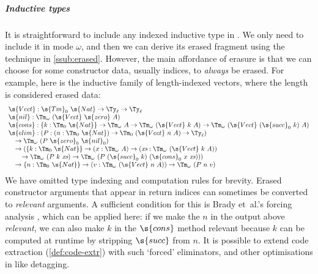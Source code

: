 \documentclass[a4paper,UKenglish,cleveref,autoref,thm-restate]{lipics-v2021}
\begin{document}
\subparagraph{Inductive types}\label{ssub:inductive}

It is straightforward to include any indexed inductive type in \ZTT. We only
need to include it in mode $\omega$, and then we can derive its erased fragment
using the technique in \cref{ssub:erased}. However, the main affordance of
erasure is that we can choose for some constructor data, usually indices, to
\emph{always} be erased. For example, here is the inductive family of
length-indexed vectors, where the length is considered erased data:
\[
\begin{array}{l}
  \s{Vect} : \s{Tm}_0\ {\s{Nat}} \to \Ty_\ell \to \Ty_\ell \\
  \s{nil} : \Tm_\omega\ (\s{Vect}\ \s{zero}\ A) \\
  \s{cons} : \{k : \Tm_0\ \s{Nat}\} \to \Tm_\omega\ A \to
    \Tm_\omega\ (\s{Vect}\ k\ A) \to \Tm_\omega\ (\s{Vect}\ (\s{succ}_0\ k)\ A) \\
  \s{elim} : (P : (n : \Tm_0\ \s{Nat}) \to \Tm_0\ (\s{Vect}\ n\ A) \to \Ty_\ell) \\
  \quad \to \Tm_\omega\ (P\ \s{zero}_0\ \s{nil}_0) \\
  \quad \to (\{k : \Tm_0\ \s{Nat}\} \to (x : \Tm_\omega\ A)
  \to (\textit{xs} : \Tm_\omega\ (\s{Vect}\ k\ A))  \\
  \quad \quad \to \Tm_\omega\ (P\ k\ \textit{xs})
  \to \Tm_\omega\ (P\ (\s{succ}_0\ k)\ (\s{cons}_0\ x\ \textit{xs}))) \\
  \quad
  \to
  \{n : \Tm_0\ \s{Nat}\} \to
  (v : \Tm_\omega\ (\s{Vect}\ n\ A))
  \to \Tm_\omega\ (P\ n\ v) \\
\end{array}\]
We have omitted type indexing and computation rules for brevity. Erased constructor
arguments that appear in return indices can sometimes be converted to
\emph{relevant} arguments. A sufficient condition for this is Brady et~al.'s
forcing analysis \cite{Brady2004-ay}, which can be applied here: if we make the
$n$ in the output above \emph{relevant}, we can also make $k$ in the $\s{cons}$
method relevant because $k$ can be computed at runtime by stripping $\s{succ}$
from $n$. It is possible to extend code extraction (\cref{def:code-extr}) with such
`forced' eliminators, and other optimisations in \cite{Brady2004-ay} like
detagging.
\end{document}
